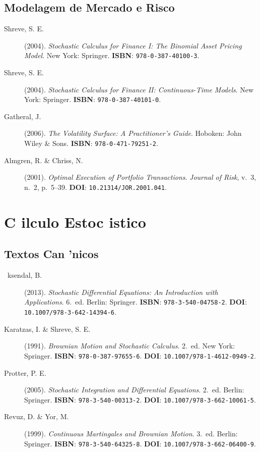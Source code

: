 \subsection{Modelagem de Mercado e Risco}

\begin{description}
\item[Shreve, S. E.] (2004). \textit{Stochastic Calculus for Finance I: The Binomial Asset Pricing Model}. New York: Springer. \textbf{ISBN}: \texttt{978-0-387-40100-3}.

\item[Shreve, S. E.] (2004). \textit{Stochastic Calculus for Finance II: Continuous-Time Models}. New York: Springer. \textbf{ISBN}: \texttt{978-0-387-40101-0}.

\item[Gatheral, J.] (2006). \textit{The Volatility Surface: A Practitioner's Guide}. Hoboken: John Wiley \& Sons. \textbf{ISBN}: \texttt{978-0-471-79251-2}.

\item[Almgren, R. \& Chriss, N.] (2001). \textit{Optimal Execution of Portfolio Transactions}. \textit{Journal of Risk}, v.~3, n.~2, p.~5--39. \textbf{DOI}: \texttt{10.21314/JOR.2001.041}.
\end{description}

\section{C ilculo Estoc istico}
\label{sec:ref_estocastico}

\subsection{Textos Can 'nicos}

\begin{description}
\item[ ~ksendal, B.] (2013). \textit{Stochastic Differential Equations: An Introduction with Applications}. 6.~ed. Berlin: Springer. \textbf{ISBN}: \texttt{978-3-540-04758-2}. \textbf{DOI}: \texttt{10.1007/978-3-642-14394-6}.

\item[Karatzas, I. \& Shreve, S. E.] (1991). \textit{Brownian Motion and Stochastic Calculus}. 2.~ed. New York: Springer. \textbf{ISBN}: \texttt{978-0-387-97655-6}. \textbf{DOI}: \texttt{10.1007/978-1-4612-0949-2}.

\item[Protter, P. E.] (2005). \textit{Stochastic Integration and Differential Equations}. 2.~ed. Berlin: Springer. \textbf{ISBN}: \texttt{978-3-540-00313-2}. \textbf{DOI}: \texttt{10.1007/978-3-662-10061-5}.

\item[Revuz, D. \& Yor, M.] (1999). \textit{Continuous Martingales and Brownian Motion}. 3.~ed. Berlin: Springer. \textbf{ISBN}: \texttt{978-3-540-64325-8}. \textbf{DOI}: \texttt{10.1007/978-3-662-06400-9}.
\end{description}

